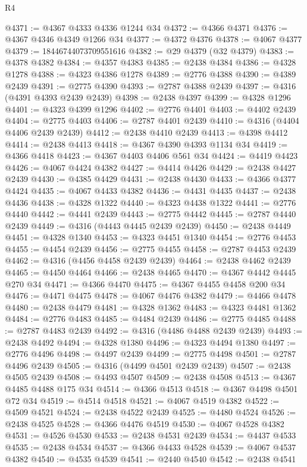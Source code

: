\begin{lexlean}{R4}
\begin{coremodule}
@4371 := @4367 @4333 @4336 @1244 @34
@4372 := @4366 @4371
@4376 := @4367 @4346 @4349 @1266 @34
@4377 := @4372 @4376
@4378 := @4067 @4377
@4379 := 18446744073709551616
@4382 := @29 @4379 (@32 @4379)
@4383 := @4378 @4382
@4384 := @4357 @4383
@4385 := @2438 @4384
@4386 := @4328 @1278
@4388 := @4323 @4386 @1278
@4389 := @2776 @4388
@4390 := @4389 @2439
@4391 := @2775 @4390
@4393 := @2787 @4388 @2439
@4397 := @4316 (@4391 @4393 @2439 @2439)
@4398 := @2438 @4397
@4399 := @4328 @1296
@4401 := @4323 @4399 @1296
@4402 := @2776 @4401
@4403 := @4402 @2439
@4404 := @2775 @4403
@4406 := @2787 @4401 @2439
@4410 := @4316 (@4404 @4406 @2439 @2439)
@4412 := @2438 @4410 @2439
@4413 := @4398 @4412
@4414 := @2438 @4413
@4418 := @4367 @4390 @4393 @1134 @34
@4419 := @4366 @4418
@4423 := @4367 @4403 @4406 @561 @34
@4424 := @4419 @4423
@4426 := @4067 @4424 @4382
@4427 := @4414 @4426
@4429 := @2438 @4427 @2439
@4430 := @4385 @4429
@4431 := @2438 @4430
@4433 := @4366 @4377 @4424
@4435 := @4067 @4433 @4382
@4436 := @4431 @4435
@4437 := @2438 @4436
@4438 := @4328 @1322
@4440 := @4323 @4438 @1322
@4441 := @2776 @4440
@4442 := @4441 @2439
@4443 := @2775 @4442
@4445 := @2787 @4440 @2439
@4449 := @4316 (@4443 @4445 @2439 @2439)
@4450 := @2438 @4449
@4451 := @4328 @1340
@4453 := @4323 @4451 @1340
@4454 := @2776 @4453
@4455 := @4454 @2439
@4456 := @2775 @4455
@4458 := @2787 @4453 @2439
@4462 := @4316 (@4456 @4458 @2439 @2439)
@4464 := @2438 @4462 @2439
@4465 := @4450 @4464
@4466 := @2438 @4465
@4470 := @4367 @4442 @4445 @270 @34
@4471 := @4366 @4470
@4475 := @4367 @4455 @4458 @200 @34
@4476 := @4471 @4475
@4478 := @4067 @4476 @4382
@4479 := @4466 @4478
@4480 := @2438 @4479
@4481 := @4328 @1362
@4483 := @4323 @4481 @1362
@4484 := @2776 @4483
@4485 := @4484 @2439
@4486 := @2775 @4485
@4488 := @2787 @4483 @2439
@4492 := @4316 (@4486 @4488 @2439 @2439)
@4493 := @2438 @4492
@4494 := @4328 @1380
@4496 := @4323 @4494 @1380
@4497 := @2776 @4496
@4498 := @4497 @2439
@4499 := @2775 @4498
@4501 := @2787 @4496 @2439
@4505 := @4316 (@4499 @4501 @2439 @2439)
@4507 := @2438 @4505 @2439
@4508 := @4493 @4507
@4509 := @2438 @4508
@4513 := @4367 @4485 @4488 @175 @34
@4514 := @4366 @4513
@4518 := @4367 @4498 @4501 @72 @34
@4519 := @4514 @4518
@4521 := @4067 @4519 @4382
@4522 := @4509 @4521
@4524 := @2438 @4522 @2439
@4525 := @4480 @4524
@4526 := @2438 @4525
@4528 := @4366 @4476 @4519
@4530 := @4067 @4528 @4382
@4531 := @4526 @4530
@4533 := @2438 @4531 @2439
@4534 := @4437 @4533
@4535 := @2438 @4534
@4537 := @4366 @4433 @4528
@4539 := @4067 @4537 @4382
@4540 := @4535 @4539
@4541 := @2440 @4540
@4542 := @2438 @4541

\end{coremodule}
\end{lexlean}
